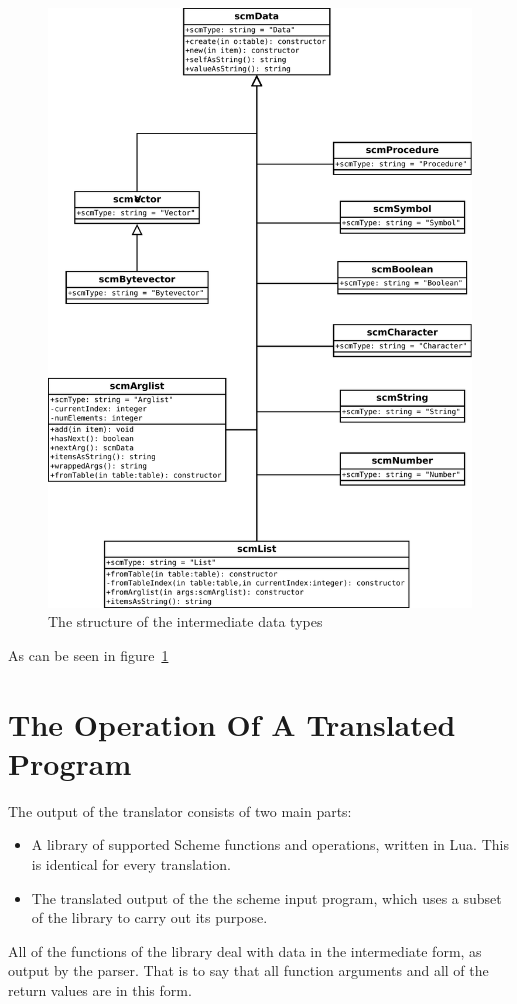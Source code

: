\begin{figure}
\centering
\includegraphics[width=\textwidth]{scmDataUML.pdf}
\caption{The structure of the intermediate data types}
\label{fig:scmDataUML}
\end{figure}

As can be seen in figure~\ref{fig:scmDataUML}


\section{The Operation Of A Translated Program}

The output of the translator consists of two main parts:
\begin{itemize}
\item A library of supported Scheme functions and operations, written in Lua.
This is identical for every translation.
\item The translated output of the the scheme input program, which uses a subset
of the library to carry out its purpose.
\end{itemize}

All of the functions of the library deal with data in the intermediate form, as
output by the parser. That is to say that all function arguments and all of the
return values are in this form.
